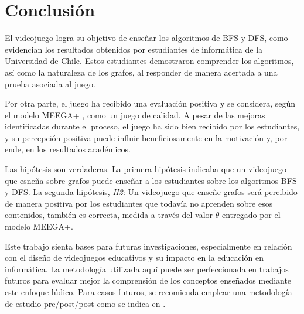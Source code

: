 \chapter{Conclusión}

El videojuego logra su objetivo de enseñar los algoritmos de BFS y DFS, como evidencian los resultados obtenidos por estudiantes de informática de la Universidad de Chile. Estos estudiantes demostraron comprender los algoritmos, así como la naturaleza de los grafos, al responder de manera acertada a una prueba asociada al juego.

Por otra parte, el juego ha recibido una evaluación positiva y se considera, según el modelo MEEGA+ \cite{meegaplus}, como un juego de calidad. A pesar de las mejoras identificadas durante el proceso, el juego ha sido bien recibido por los estudiantes, y su percepción positiva puede influir beneficiosamente en la motivación y, por ende, en los resultados académicos.

Las hipótesis son verdaderas. La primera hipótesis indicaba que un videojuego que esneña sobre grafos puede enseñar a los estudiantes sobre los algoritmos BFS y DFS. La segunda hipótesis,
\emph{H2}: Un videojuego que enseñe grafos será percibido de manera positiva por los estudiantes que todavía no aprenden sobre esos contenidos, también es correcta, medida a través del valor $\theta$ entregado por el modelo MEEGA+.

Este trabajo sienta bases para futuras investigaciones, especialmente en relación con el diseño de videojuegos educativos y su impacto en la educación en informática. La metodología utilizada aquí puede ser perfeccionada en trabajos futuros para evaluar mejor la comprensión de los conceptos enseñados mediante este enfoque lúdico. Para casos futuros, se recomienda emplear una metodología de estudio pre/post/post como se indica en \cite{HowGamesComputingEducationEvaluated}.





